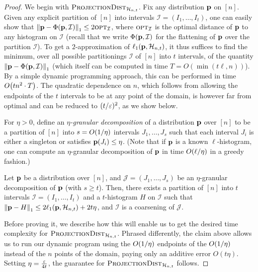 \begin{proof}
We begin with $\estimdist[\classhist]$. Fix any distribution $\D$ on $[n]$. Given any explicit partition of $[n]$ into intervals $\mathcal{I}=(I_1,\dots,I_t)$, one can easily show that $\normone{\D - \Phi(\D,\mathcal{I})} \leq 2\opt_{\mathcal{I}}$, where $\opt_{\mathcal{I}}$ is the optimal distance of $\D$ to any histogram on $\mathcal{I}$ (recall that we write $\Phi(\D,\mathcal{I})$ for the flattening of $\D$ over the partition $\mathcal{I}$). To get a $2$-approximation of $\lp[1](\D,\classhist)$, it thus suffices to find the minimum, over all possible partitionings $\mathcal{I}$ of $[n]$ into $t$ intervals, of the quantity $\normone{\D - \Phi(\D,\mathcal{I})}$ (which itself can be computed in time $T=O(\min(t\ell,n))$). By a simple dynamic programming approach, this can be performed in time $\bigO{t n^2 \cdot T}$. The quadratic dependence on $n$, which follows from allowing the endpoints of the $t$ intervals to be at any point of the domain, is however far from optimal and can be reduced to $(t/\eps)^2$, as we show below.

For $\eta > 0$, define an \emph{$\eta$-granular decomposition} of a distribution $\D$ over $[n]$ to be a partition of $[n]$ into $s=\bigO{1/\eta}$ intervals $J_1,\dots,J_s$ such that each interval $J_i$ is either a singleton or satisfies $\D(J_i) \leq \eta$. (Note that if $\D$ is a known $\ell$-histogram, one can compute an $\eta$-granular decomposition of $\D$ in time $\bigO{\ell/\eta}$ in a greedy fashion.)

\begin{claim}\label{claim:granularity:piecewise:projection}
Let $\D$ be a distribution over $[n]$, and $\mathcal{J} = (J_1,\dots,J_s)$ be an $\eta$-granular decomposition of $\D$ (with $s\geq t$). Then, there exists a partition of $[n]$ into $t$ intervals $\mathcal{I}=(I_1,\dots,I_t)$ and a $t$-histogram $H$ on $\mathcal{I}$ such that $\normone{\D - H} \leq 2\lp[1](\D,\classhist[t])+2t\eta$, and $\mathcal{I}$ is a coarsening of $\mathcal{J}$.
\end{claim}
Before proving it, we describe how this will enable us to get the desired time complexity for $\estimdist[\classhist]$. Phrased differently, the claim above allows us to run our dynamic program using the $\bigO{1/\eta}$ endpoints of the $\bigO{1/\eta}$ instead of the $n$ points of the domain, paying only an additive error $O(t\eta)$. Setting $\eta=\frac{\eps}{4t}$, the guarantee for $\estimdist[\classhist]$ follows.


\end{proof}
